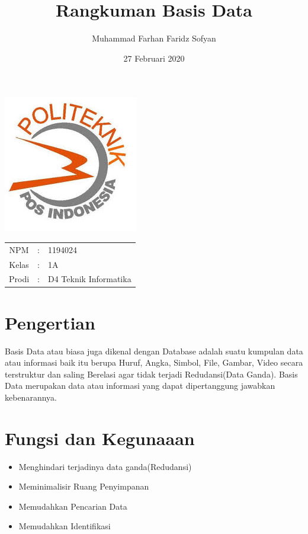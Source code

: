 \documentclass{article}
\title{Rangkuman Basis Data}
\author{Muhammad Farhan Faridz Sofyan}
\date{27 Februari 2020}
\begin{document}
\maketitle
\begin{center}
\includegraphics{logo.poltekpos.jpg}    
\end{center}

\begin{center}
\begin{tabular}{c c l}

    NPM & : & 1194024\\
    Kelas & : & 1A\\
    Prodi & : & D4 Teknik Informatika\\
\end{tabular}    
\end{center}

\newpage
\section{Pengertian}
Basis Data atau biasa juga dikenal dengan Database adalah suatu kumpulan data atau informasi baik itu berupa Huruf, Angka, Simbol, File, Gambar, Video secara terstruktur dan saling Berelasi agar tidak terjadi Redudansi(Data Ganda).
Basis Data merupakan data atau informasi yang dapat dipertanggung jawabkan kebenarannya.


\section{Fungsi dan Kegunaaan}
\begin{itemize}
    \item Menghindari terjadinya data ganda(Redudansi)
    \item Meminimalisir Ruang Penyimpanan
    \item Memudahkan Pencarian Data
    \item Memudahkan Identifikasi
\end{itemize}
\end{document}
